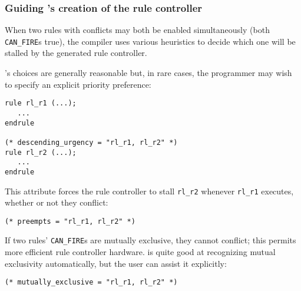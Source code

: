 
\begin{frame}[fragile]
\frametitle{Guiding {\bsc}'s creation of the rule controller}

\footnotesize

When two rules with conflicts may both be enabled simultaneously (both
{\tt CAN\_FIRE}s true), the {\bsc} compiler uses various heuristics to
decide which one will be stalled by the generated rule controller.

\vspace{2ex}

\begin{minipage}{0.5\textwidth}
 {\bsc}'s choices are generally reasonable but, in rare cases, the
 programmer may wish to specify an explicit priority preference:
\end{minipage}
\hm
\begin{minipage}{0.45\textwidth}
\begin{Verbatim}[frame=single]
rule rl_r1 (...);
   ...
endrule

(* descending_urgency = "rl_r1, rl_r2" *)
rule rl_r2 (...);
   ...
endrule
\end{Verbatim}
\end{minipage}

\vspace{4ex}

\begin{minipage}{0.5\textwidth}
This attribute forces the rule controller to stall \verb|rl_r2|
whenever \verb|rl_r1| executes, whether or not they conflict:
\end{minipage}
\hm
\begin{minipage}{0.45\textwidth}
\begin{Verbatim}[frame=single]
(* preempts = "rl_r1, rl_r2" *)
\end{Verbatim}
\end{minipage}

\vspace{4ex}

\begin{minipage}{0.5\textwidth}
If two rules' {\tt CAN\_FIRE}s are mutually exclusive, they cannot
conflict; this permits more efficient rule controller hardware.
{\bsc} is quite good at recognizing mutual exclusivity automatically,
but the user can assist it explicitly:
\end{minipage}
\hm
\begin{minipage}{0.45\textwidth}
\begin{Verbatim}[frame=single]
(* mutually_exclusive = "rl_r1, rl_r2" *)
\end{Verbatim}
\end{minipage}

\end{frame}

